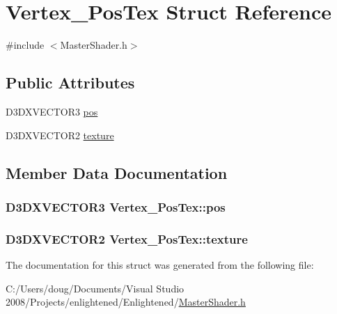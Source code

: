 \hypertarget{struct_vertex___pos_tex}{
\section{Vertex\_\-PosTex Struct Reference}
\label{struct_vertex___pos_tex}
}


{\ttfamily \#include $<$MasterShader.h$>$}\subsection*{Public Attributes}
\begin{DoxyCompactItemize}
\item 
D3DXVECTOR3 \hyperlink{struct_vertex___pos_tex_aa3700774b0d2fdf22505c158dd65c188}{pos}
\item 
D3DXVECTOR2 \hyperlink{struct_vertex___pos_tex_a114089d7c062124cb1b7b53dd790b4b7}{texture}
\end{DoxyCompactItemize}


\subsection{Member Data Documentation}
\hypertarget{struct_vertex___pos_tex_aa3700774b0d2fdf22505c158dd65c188}{
\subsubsection[{pos}]{\setlength{\rightskip}{0pt plus 5cm}D3DXVECTOR3 {\bf Vertex\_\-PosTex::pos}}}
\label{struct_vertex___pos_tex_aa3700774b0d2fdf22505c158dd65c188}
\hypertarget{struct_vertex___pos_tex_a114089d7c062124cb1b7b53dd790b4b7}{
\subsubsection[{texture}]{\setlength{\rightskip}{0pt plus 5cm}D3DXVECTOR2 {\bf Vertex\_\-PosTex::texture}}}
\label{struct_vertex___pos_tex_a114089d7c062124cb1b7b53dd790b4b7}


The documentation for this struct was generated from the following file:\begin{DoxyCompactItemize}
\item 
C:/Users/doug/Documents/Visual Studio 2008/Projects/enlightened/Enlightened/\hyperlink{_master_shader_8h}{MasterShader.h}\end{DoxyCompactItemize}
